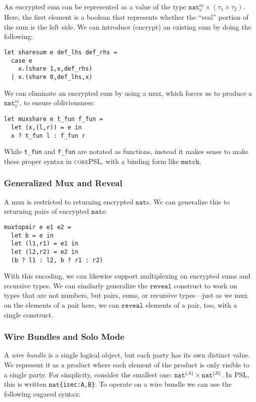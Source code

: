 \documentclass[10pt]{article}
\newcommand{\kw}[1]{\ensuremath{\mathtt{#1}}}
\newcommand{\tnat}{\ensuremath{\mathtt{nat}}}
\newcommand{\tpair}[2]{\ensuremath{{#1} \times {#2}}}
\newcommand{\lang}{\textsc{corePSL}\xspace}
\begin{document}
An encrypted sum can be represented as a value of the type
$\tpair{\tnat^m_\psi}{(\tpair{\tau_1}{\tau_2})}$. Here, the first
element is a boolean that represents whether the ``real'' portion of
the sum is the left side. We can introduce (encrypt) an existing sum
by doing the following:
\begin{verbatim}
let sharesum e def_lhs def_rhs =
  case e 
    x.(share 1,x,def_rhs)
  | x.(share 0,def_lhs,x)
\end{verbatim}
We can eliminate an encrypted sum by using a mux, which forces us
to produce a $\tnat^m_\psi$, to ensure obliviousness:
\begin{verbatim}
let muxshare e t_fun f_fun =
  let (x,(l,r)) = e in
  x ? t_fun l : f_fun r
\end{verbatim}
While \verb+t_fun+ and \verb+f_fun+ are notated as functions, instead
it makes sense to make these proper syntax in \lang, with a
binding form like $\kw{match}$.

\subsubsection{Generalized Mux and Reveal}
\label{sec:generalmux}

A mux is restricted to returning encrypted
$\tnat$s. We can generalize this to returning pairs of encrypted
$\tnat$s:
\begin{verbatim}
muxtopair e e1 e2 =
  let b = e in
  let (l1,r1) = e1 in
  let (l2,r2) = e2 in
  (b ? l1 : l2, b ? r1 : r2)
\end{verbatim}
With this encoding, we can likewise support multiplexing on encrypted
sums and recursive types.
%
We can similarly generalize the $\kw{reveal}$ construct to work on types
that are not numbers, but pairs, sums, or recursive types---just as we
mux on the elements of a pair here, we can \kw{reveal} elements
of a pair, too, with a single construct.

\subsubsection{Wire Bundles and Solo Mode}
\label{sec:wirebundles}

A \emph{wire bundle} is a single logical object, but each party has
its own distinct value.  We represent it as a product where each
element of the product is only visible to a single party. For
simplicity, consider the smallest one:
$\tpair{\tnat^{\{A\}}}{\tnat^{\{B\}}}$. In PSL, this is written
$\tnat$\texttt{\{isec:A,B\}}. To operate on a wire bundle we can use the
following sugared syntax:
\end{document}
